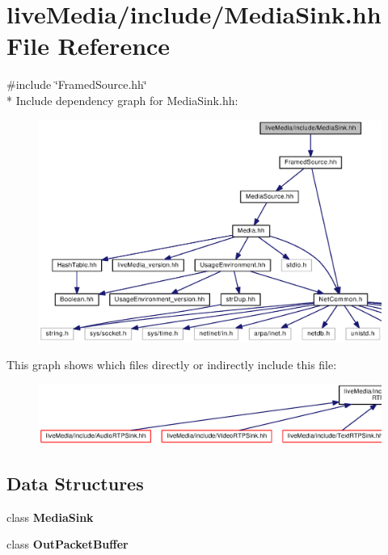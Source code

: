 \section{live\+Media/include/\+Media\+Sink.hh File Reference}
\label{MediaSink_8hh}
{\ttfamily \#include \char`\"{}Framed\+Source.\+hh\char`\"{}}\\*
Include dependency graph for Media\+Sink.\+hh\+:
\nopagebreak
\begin{figure}[H]
\begin{center}
\leavevmode
\includegraphics[width=350pt]{MediaSink_8hh__incl}
\end{center}
\end{figure}
This graph shows which files directly or indirectly include this file\+:
\nopagebreak
\begin{figure}[H]
\begin{center}
\leavevmode
\includegraphics[width=350pt]{MediaSink_8hh__dep__incl}
\end{center}
\end{figure}
\subsection*{Data Structures}
\begin{DoxyCompactItemize}
\item 
class {\bf Media\+Sink}
\item 
class {\bf Out\+Packet\+Buffer}
\end{DoxyCompactItemize}
